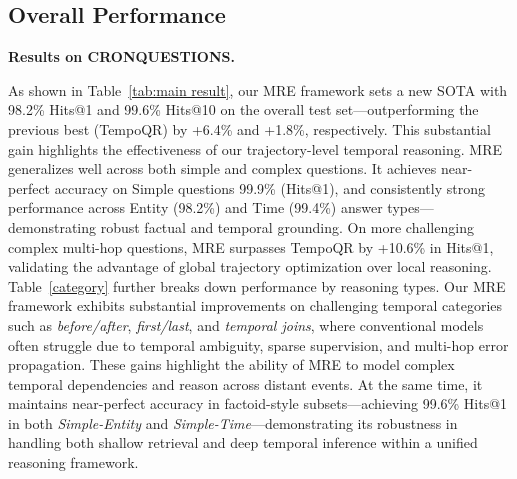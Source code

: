 \documentclass[letterpaper]{article} %
\begin{document}
\subsection{Overall Performance}
\label{subsec:overall}
\noindent\textbf{Results on \textsc{CRONQUESTIONS}.}
\begin{table}
\centering
{}
    \caption{Hits@1 for different models on TimeQuestions.}
\label{tab:mainresult2}
\end{table}
As shown in Table~\ref{tab:main result}, our MRE framework sets a new SOTA with 98.2\% Hits@1 and 99.6\% Hits@10 on the overall test set—outperforming the previous best (TempoQR) by +6.4\% and +1.8\%, respectively. This substantial gain highlights the effectiveness of our trajectory-level temporal reasoning. MRE generalizes well across both simple and complex questions. It achieves near-perfect accuracy on Simple questions 99.9\% (Hits@1), and consistently strong performance across Entity (98.2\%) and Time (99.4\%) answer types—demonstrating robust factual and temporal grounding. On more challenging complex multi-hop questions, MRE surpasses TempoQR by +10.6\% in Hits@1, validating the advantage of global trajectory optimization over local reasoning.
Table~\ref{category} further breaks down performance by reasoning types. Our MRE framework exhibits substantial improvements on challenging temporal categories such as \textit{before/after}, \textit{first/last}, and \textit{temporal joins}, where conventional models often struggle due to temporal ambiguity, sparse supervision, and multi-hop error propagation. These gains highlight the ability of MRE to model complex temporal dependencies and reason across distant events. At the same time, it maintains near-perfect accuracy in factoid-style subsets—achieving 99.6\% Hits@1 in both \textit{Simple-Entity} and \textit{Simple-Time}—demonstrating its robustness in handling both shallow retrieval and deep temporal inference within a unified reasoning framework.
\end{document}
